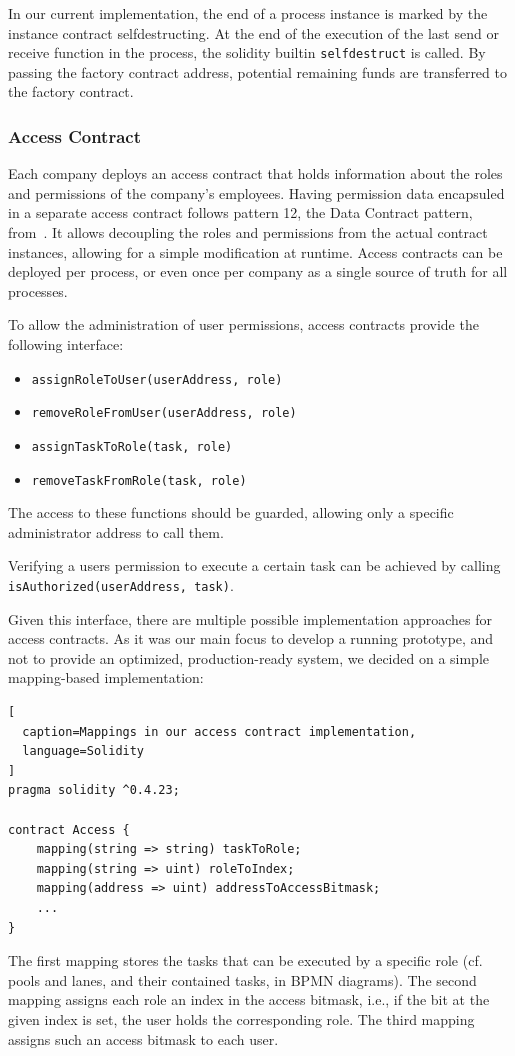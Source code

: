 \documentclass[runningheads]{llncs}
\begin{document}
In our current implementation, the end of a process instance is marked by the instance contract selfdestructing.
At the end of the execution of the last send or receive function in the process, the solidity builtin \texttt{selfdestruct} is called.
By passing the factory contract address, potential remaining funds are transferred to the factory contract.

\subsubsection{Access Contract}

Each company deploys an access contract that holds information about the roles and permissions of the company's employees.
Having permission data encapsuled in a separate access contract follows pattern 12, the Data Contract pattern, from~\cite{xu2018pattern}.
It allows decoupling the roles and permissions from the actual contract instances, allowing for a simple modification at runtime.
Access contracts can be deployed per process, or even once per company as a single source of truth for all processes.

To allow the administration of user permissions, access contracts provide the following interface:
\begin{itemize}
	\item \texttt{assignRoleToUser(userAddress, role)}
	\item \texttt{removeRoleFromUser(userAddress, role)}
	\item \texttt{assignTaskToRole(task, role)}
	\item \texttt{removeTaskFromRole(task, role)}
\end{itemize}
The access to these functions should be guarded, allowing only a specific administrator address to call them.

Verifying a users permission to execute a certain task can be achieved by calling \texttt{isAuthorized(userAddress, task)}.
\newline

Given this interface, there are multiple possible implementation approaches for access contracts.
As it was our main focus to develop a running prototype, and not to provide an optimized, production-ready system, we decided on a simple mapping-based implementation:
\begin{lstlisting}[
  caption=Mappings in our access contract implementation,
  language=Solidity
]
pragma solidity ^0.4.23;

contract Access {
    mapping(string => string) taskToRole;
    mapping(string => uint) roleToIndex;
    mapping(address => uint) addressToAccessBitmask;
    ...
}
\end{lstlisting}
The first mapping stores the tasks that can be executed by a specific role (cf. pools and lanes, and their contained tasks, in BPMN diagrams).
The second mapping assigns each role an index in the access bitmask, i.e., if the bit at the given index is set, the user holds the corresponding role.
The third mapping assigns such an access bitmask to each user.
\end{document}
